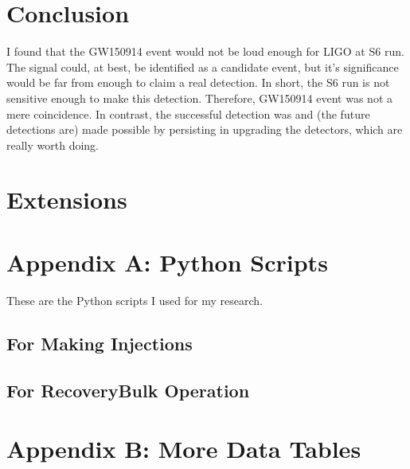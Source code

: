 \documentclass[aps,prd,preprint]{revtex4}
\begin{document}
\section{Conclusion}
I found that the GW150914 event would not be loud enough for LIGO at S6 run. The signal could, at best, be identified as a candidate event, but it's significance would be far from enough to claim a real detection. In short, the S6 run is not sensitive enough to make this detection. Therefore, GW150914 event was not a mere coincidence. In contrast, the successful detection was and (the future detections are) made possible by persisting in upgrading the detectors, which are really worth doing.


\section{Extensions}


\section{Appendix A: Python Scripts}
These are the Python scripts I used for my research.
\subsection{For Making Injections \label{sec:Appendix1}}

\subsection{For Recovery\textemdash Bulk Operation \label{sec:Appendix2}}



\section{Appendix B: More Data Tables}

\end{document}

